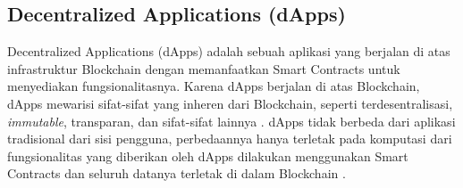 \subsection{Decentralized Applications (dApps)}
\label{subsec:dapps}

Decentralized Applications (dApps) adalah sebuah aplikasi yang berjalan di atas infrastruktur Blockchain dengan memanfaatkan Smart Contracts untuk menyediakan fungsionalitasnya. Karena dApps berjalan di atas Blockchain, dApps mewarisi sifat-sifat yang inheren dari Blockchain, seperti terdesentralisasi, \textit{immutable}, transparan, dan sifat-sifat lainnya \parencite{investopedia2024}. dApps tidak berbeda dari aplikasi tradisional dari sisi pengguna, perbedaannya hanya terletak pada komputasi dari fungsionalitas yang diberikan oleh dApps dilakukan menggunakan Smart Contracts dan seluruh datanya terletak di dalam Blockchain \parencite{metcalfe2020ethereum}.

